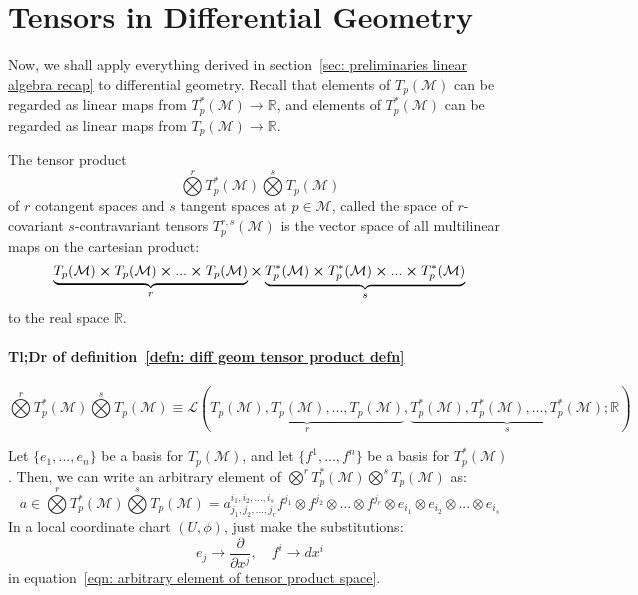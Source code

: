     \section{Tensors in Differential Geometry}
      Now, we shall apply everything derived in section~\ref{sec:
      preliminaries linear algebra recap} to differential geometry. Recall
      that elements of $T_p(\mathcal{M})$ can be regarded as linear maps from
      $T_p^*(\mathcal{M}) \rightarrow \mathbb{R}$, and elements of
      $T^*_p(\mathcal{M})$ can be regarded as linear maps from
      $T_p(\mathcal{M}) \rightarrow \mathbb{R}$.
      \begin{definition}
        \label{defn: diff geom tensor product defn}
        The tensor product \[\bigotimes\limits^r T^*_p(\mathcal{M})
        \bigotimes\limits^s T_p(\mathcal{M})\] of $r$ cotangent spaces and $s$
        tangent spaces at $p \in \mathcal{M}$, called the space of
        $r$-covariant $s$-contravariant tensors $T^{r,s}_p(\mathcal{M})$ is
        the vector space of all multilinear maps on the cartesian product:
        \[\underbrace{T_p(\mathcal{M}) \cross T_p(\mathcal{M}) \cross ...
        \cross T_p(\mathcal{M})}_{r} \cross \underbrace{T^*_p(\mathcal{M})
        \cross T^*_p(\mathcal{M}) \cross ... \cross T^*_p(\mathcal{M})}_{s}\]
        to the real space $\mathbb{R}$.

        \paragraph{Tl;Dr of definition~\ref{defn: diff geom tensor product
        defn}}
        \[\bigotimes\limits^r T^*_p(\mathcal{M}) \bigotimes\limits^s
        T_p(\mathcal{M}) \equiv
        \mathcal{L}(\underbrace{T_p(\mathcal{M}),T_p(\mathcal{M}),...,T_p(\mathcal{M})}_{r},\underbrace{T^*_p(\mathcal{M}),T^*_p(\mathcal{M}),...,T^*_p(\mathcal{M})}_{s}; \mathbb{R})
        \]
      \end{definition}
      \begin{remark}
        Let $\{e_1,...,e_n\}$ be a basis for $T_p(\mathcal{M})$, and let
        $\{f^1,...,f^n\}$ be a basis for $T_p^*(\mathcal{M})$. Then, we can
        write an arbitrary element of $\bigotimes\limits^r T^*_p(\mathcal{M})
        \bigotimes\limits^s T_p(\mathcal{M})$ as:
        \begin{equation}
          \label{eqn: arbitrary element of tensor product space}
          a \in \bigotimes\limits^r T^*_p(\mathcal{M}) \bigotimes\limits^s
          T_p(\mathcal{M}) = a^{i_1,i_2,...,i_s}_{j_1,j_2,...,j_r}
          f^{j_1}\otimes f^{j_2} \otimes ...\otimes f^{j_r} \otimes e_{i_1}
          \otimes e_{i_2} \otimes ... \otimes e_{i_s}
        \end{equation}
        In a local coordinate chart $(U,\phi)$, just make the substitutions:
        \[e_j \rightarrow \frac{\partial}{\partial x^j}, \quad f^i
        \rightarrow dx^i\]
        in equation~\ref{eqn: arbitrary element of tensor product space}.
      \end{remark}
